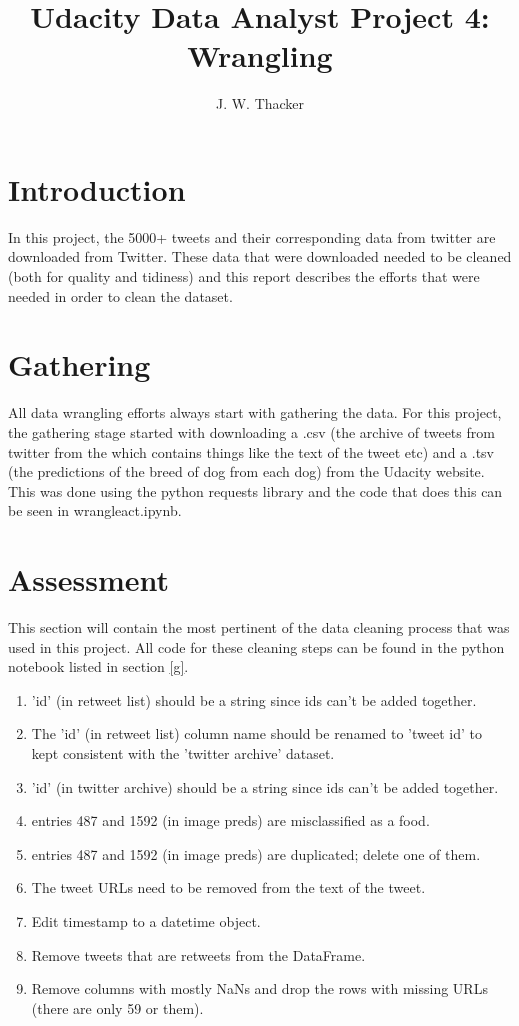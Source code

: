 \documentclass[12pt]{article}
\begin{document}
\title{Udacity Data Analyst Project 4: Wrangling}
\author{J. W. Thacker}
\maketitle

\section{Introduction}
In this project, the 5000+ tweets and their corresponding data from twitter are downloaded from Twitter. These data that were downloaded needed to be cleaned (both for quality and tidiness) and this report describes the efforts that were needed in order to clean the dataset.

\section{Gathering\label{g}}
All data wrangling efforts always start with gathering the data. For this project, the gathering stage started with downloading a .csv (the archive of tweets from twitter from the which contains things like the text of the tweet etc) and a .tsv (the predictions of the breed of dog from each dog) from the Udacity website. This was done using the python requests library and the code that does this can be seen in wrangle\textunderscore act.ipynb.

\section{Assessment}
This section will contain the most pertinent of the data cleaning process that was used in this project. All code for these cleaning steps can be found in the python notebook listed in section \ref{g}.
\begin{table}
	\begin{enumerate}
	\caption{List of Quality Issues that were fixed} \label{list1}
		\item 'id' (in retweet list) should be a string since ids can't be added together.
		\item The 'id' (in retweet list) column name should be renamed to 'tweet id' to kept consistent with the 'twitter archive' dataset.
		\item 'id' (in twitter archive) should be a string since ids can't be added together.
		\item entries 487 and 1592 (in image preds) are misclassified as a food.
		\item entries 487 and 1592 (in image preds) are duplicated; delete one of them.
		\item The tweet URLs need to be removed from the text of the tweet.
		\item Edit timestamp to a datetime object.
		\item Remove tweets that are retweets from the DataFrame.
		\item Remove columns with mostly NaNs and drop the rows with missing URLs (there are only 59 or them).
	\end{enumerate}
\end{table}
\end{document}
